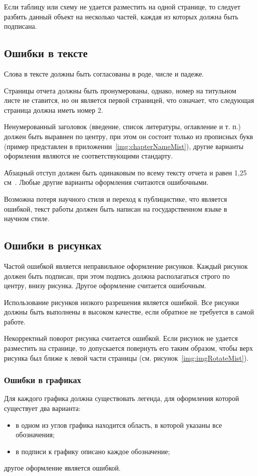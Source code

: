 Если таблицу или схему не удается разместить на одной странице, то следует разбить данный объект на несколько частей, каждая из которых должна быть подписана.

\subsection{Ошибки в тексте}
Слова в тексте должны быть согласованы в роде, числе и падеже.

Страницы отчета должны быть пронумерованы, однако, номер на титульном листе не ставится, но он является первой страницей, что означает, что следующая страница должна иметь номер ${2}$.

Ненумерованный заголовок (введение, список литературы, оглавление и т. п.) должен быть выравнен по центру, при этом он состоит только из прописных букв (пример представлен в приложении~\ref{img:chapterNameMist}), другие варианты оформления являются не соответствующими стандарту.

Абзацный отступ должен быть одинаковым по всему тексту отчета и равен 1,25 см~\cite{GOST732}. Любые другие варианты оформления считаются ошибочными.

Возможна потеря научного стиля и переход к публицистике, что является ошибкой, текст работы должен быть написан на государственном языке в научном стиле.

\subsection{Ошибки в рисунках}
Частой ошибкой является неправильное оформление рисунков. Каждый рисунок должен быть подписан, при этом подпись должна располагаться строго по центру, внизу рисунка. Другое оформление считается ошибочным.

Использование рисунков низкого разрешения является ошибкой. Все рисунки должны быть выполнены в высоком качестве, если обратное не требуется в самой работе.

Некорректный поворот рисунка считается ошибкой. Если рисунок не удается разместить на странице, то допускается повернуть его таким образом, чтобы верх рисунка был ближе к левой части страницы (см. рисунок~\ref{img:imgRotateMist}).

\subsubsection{Ошибки в графиках}
Для каждого графика должна существовать легенда, для оформления которой существует два варианта:
\begin{itemize}
	\item в одном из углов графика находится область, в которой указаны все обозначения;
	\item в подписи к графику описано каждое обозначение;
\end{itemize}
другое оформление является ошибкой.

